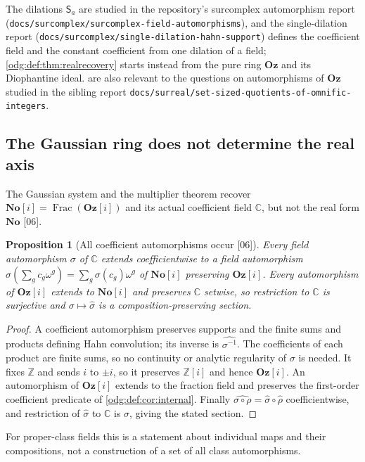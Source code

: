 \documentclass[11pt,oneside]{article}
\numberwithin{equation}{section}
\newtheorem{proposition}[proposition]{Proposition}
\theoremstyle{definition}
\theoremstyle{remark}
\newcommand{\No}{\mathbf{No}}
\newcommand{\Oz}{\mathbf{Oz}}
\newcommand{\Z}{\mathbb Z}
\newcommand{\C}{\mathbb C}
\newcommand{\Frac}{\operatorname{Frac}}
\newcommand{\src}[1]{\textup{\textsf{\small[#1]}}}
\newcommand{\fn}[1]{\nolinkurl{#1}}
\newcommand{\Og}{\Oz[i]}
\begin{document}
The dilations $\mathsf S_a$ are studied in the repository's surcomplex
automorphism report (\fn{docs/surcomplex/surcomplex-field-automorphisms}), and
the single-dilation report (\fn{docs/surcomplex/single-dilation-hahn-support})
defines the coefficient field and the constant coefficient from one dilation of
a field; \cref{odg:def:thm:realrecovery} starts instead from the pure ring $\Oz$
and its Diophantine ideal.  are
also relevant to the questions on automorphisms of $\Oz$ studied in the
sibling report \fn{docs/surreal/set-sized-quotients-of-omnific-integers}.

\subsection{The Gaussian ring does not determine the real axis}

The Gaussian system and the multiplier theorem recover $\No[i]=\Frac(\Og)$ and
its actual coefficient field $\C$, but not the real form $\No$ \src{06}.

\begin{proposition}[All coefficient automorphisms occur \src{06}]\label{odg:def:prop:coeffaut}
Every field automorphism $\sigma$ of $\C$ extends coefficientwise to a field
automorphism $\hat\sigma(\sum_gc_g\omega^g)=\sum_g\sigma(c_g)\omega^g$ of
$\No[i]$ preserving $\Og$. Every automorphism of $\Og$ extends to $\No[i]$ and
preserves $\C$ setwise, so restriction to $\C$ is surjective and
$\sigma\mapsto\hat\sigma$ is a composition-preserving section.
\end{proposition}
\begin{proof}
A coefficient automorphism preserves supports and the finite sums and products
defining Hahn convolution; its inverse is $\widehat{\sigma^{-1}}$.
The coefficients of each product are finite sums, so no continuity or
analytic regularity of $\sigma$ is needed. It fixes $\Z$
and sends $i$ to $\pm i$, so it preserves $\Z[i]$ and hence $\Og$. An
automorphism of $\Og$ extends to the fraction field and preserves the
first-order coefficient predicate of \cref{odg:def:cor:internal}.
Finally $\widehat{\sigma\circ\rho}=\hat\sigma\circ\hat\rho$ coefficientwise,
and restriction of $\hat\sigma$ to $\C$ is $\sigma$, giving the stated
section.
\end{proof}

For proper-class fields this is a statement about individual maps and their
compositions, not a construction of a set of all class automorphisms.
\end{document}
